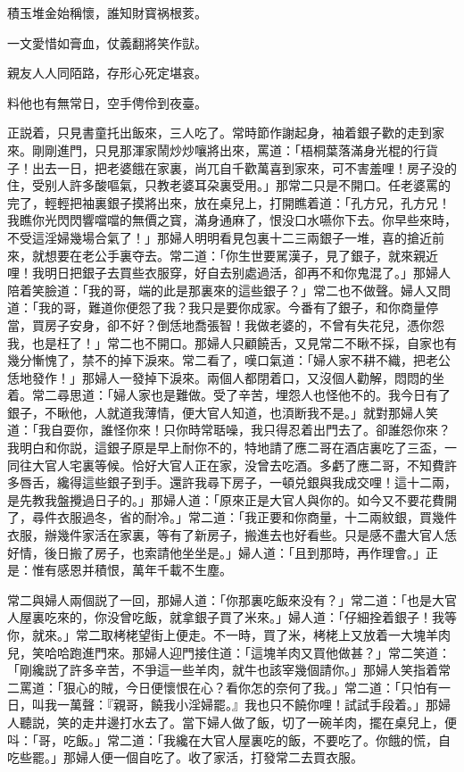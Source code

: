 積玉堆金始稱懷，誰知財寳祸根荄。

一文愛惜如膏血，仗義翻將笑作獃。

親友人人同陌路，存形心死定堪哀。

料他也有無常日，空手俜伶到夜臺。

正説着，只見書童托出飯來，三人吃了。常時節作謝起身，袖着銀子歡的走到家來。剛剛進門，只見那渾家鬧炒炒嚷將出來，罵道：「梧桐葉落滿身光棍的行貨子！出去一日，把老婆餓在家裏，尚兀自千歡萬喜到家來，可不害羞哩！房子没的住，受别人許多酸嘔氣，只教老婆耳朶裏受用。」那常二只是不開口。任老婆罵的完了，輕輕把袖裏銀子摸將出來，放在桌兒上，打開瞧着道：「孔方兄，孔方兄！我瞧你光閃閃響噹噹的無價之寳，滿身通麻了，恨没口水嚥你下去。你早些來時，不受這淫婦幾場合氣了！」那婦人明明看見包裏十二三兩銀子一堆，喜的搶近前來，就想要在老公手裏夺去。常二道：「你生世要駡漢子，見了銀子，就來親近哩！我明日把銀子去買些衣服穿，好自去别處過活，卻再不和你鬼混了。」那婦人陪着笑臉道：「我的哥，端的此是那裏來的這些銀子？」常二也不做聲。婦人又問道：「我的哥，難道你便怨了我？我只是要你成家。今番有了銀子，和你商量停當，買房子安身，卻不好？倒恁地喬張智！我做老婆的，不曾有失花兒，憑你怨我，也是枉了！」常二也不開口。那婦人只顧饒舌，又見常二不瞅不採，自家也有幾分慚愧了，禁不的掉下淚來。常二看了，嘆口氣道：「婦人家不耕不織，把老公恁地發作！」那婦人一發掉下淚來。兩個人都閉着口，又沒個人勸解，悶悶的坐着。常二尋思道：「婦人家也是難做。受了辛苦，埋怨人也怪他不的。我今日有了銀子，不瞅他，人就道我薄情，便大官人知道，也湏断我不是。」就對那婦人笑道：「我自耍你，誰怪你來！只你時常聒噪，我只得忍着出門去了。卻誰怨你來？我明白和你説，這銀子原是早上耐你不的，特地請了應二哥在酒店裏吃了三盃，一同往大官人宅裏等候。恰好大官人正在家，没曾去吃酒。多虧了應二哥，不知費許多唇舌，纔得這些銀子到手。還許我尋下房子，一頓兑銀與我成交哩！這十二兩，是先教我盤攪過日子的。」那婦人道：「原來正是大官人與你的。如今又不要花費開了，尋件衣服過冬，省的耐冷。」常二道：「我正要和你商量，十二兩紋銀，買幾件衣服，辦幾件家活在家裏，等有了新房子，搬進去也好看些。只是感不盡大官人恁好情，後日搬了房子，也索請他坐坐是。」婦人道：「且到那時，再作理會。」正是：惟有感恩并積恨，萬年千載不生塵。

常二與婦人兩個説了一回，那婦人道：「你那裏吃飯來没有？」常二道：「也是大官人屋裏吃來的，你没曾吃飯，就拿銀子買了米來。」婦人道：「仔細拴着銀子！我等你，就來。」常二取栲栳望街上便走。不一時，買了米，栲栳上又放着一大塊羊肉兒，笑哈哈跑進門來。那婦人迎門接住道：「這塊羊肉又買他做甚？」常二笑道：「剛纔説了許多辛苦，不爭這一些羊肉，就牛也該宰幾個請你。」那婦人笑指着常二罵道：「狠心的賊，今日便懷恨在心？看你怎的奈何了我。」常二道：「只怕有一日，叫我一萬聲：『親哥，饒我小淫婦罷。』我也只不饒你哩！試試手段着。」那婦人聽説，笑的走井邊打水去了。當下婦人做了飯，切了一碗羊肉，擺在桌兒上，便呌：「哥，吃飯。」常二道：「我纔在大官人屋裏吃的飯，不要吃了。你餓的慌，自吃些罷。」那婦人便一個自吃了。收了家活，打發常二去買衣服。

